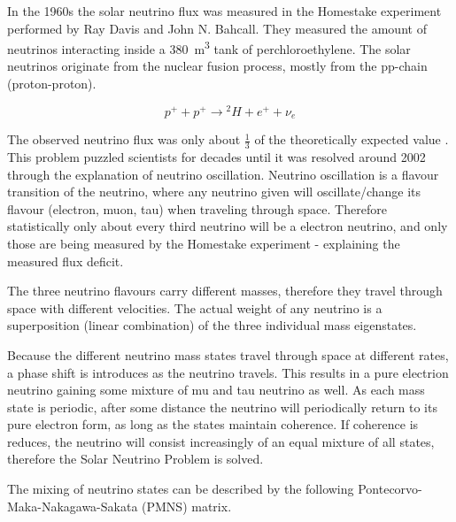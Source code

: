 \documentclass[a4paper,10pt]{scrartcl}
\begin{document}
In the 1960s the solar neutrino flux was measured in the Homestake experiment performed by Ray Davis and John N. Bahcall.
They measured the amount of neutrinos interacting inside a \SI{380}{m^3} tank of perchloroethylene.
The solar neutrinos originate from the nuclear fusion process, mostly from the pp-chain (proton-proton).

\begin{equation}
    p^+ + p^+ \longrightarrow {^2H} + e^+ + \nu_e
\end{equation}

The observed neutrino flux was only about $\frac{1}{3}$ of the theoretically expected value \cite{nbi-neutrino}.
This problem puzzled scientists for decades until it was resolved around 2002 through the explanation of neutrino oscillation.
Neutrino oscillation is a flavour transition of the neutrino, where any neutrino given will oscillate/change its flavour (electron, muon, tau) when traveling through space.
Therefore statistically only about every third neutrino will be a electron neutrino, and only those are being measured by the Homestake experiment - explaining the measured flux deficit.

The three neutrino flavours carry different masses, therefore they travel through space with different velocities.
The actual weight of any neutrino is a superposition (linear combination) of the three individual mass eigenstates.

Because the different neutrino mass states travel through space at different rates, a phase shift is introduces as the neutrino travels.
This results in a pure electrion neutrino gaining some mixture of mu and tau neutrino as well.
As each mass state is periodic, after some distance the neutrino will periodically return to its pure electron form, as long as the states maintain coherence.
If coherence is reduces, the neutrino will consist increasingly of an equal mixture of all states, therefore the Solar Neutrino Problem is solved.

The mixing of neutrino states can be described by the following Pontecorvo-Maka-Nakagawa-Sakata (PMNS) matrix.
\end{document}
